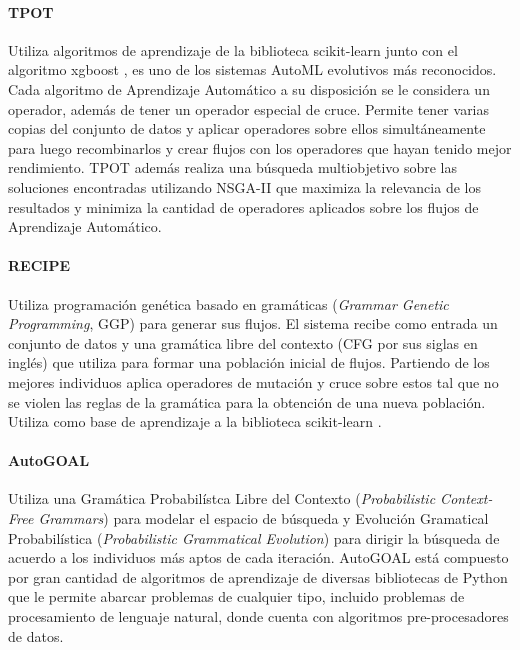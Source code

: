 \paragraph*{TPOT } Utiliza algoritmos de aprendizaje de la biblioteca scikit-learn  junto con el algoritmo xgboost , es uno de los sistemas AutoML evolutivos m\'as reconocidos. Cada algoritmo de Aprendizaje Autom\'atico a su disposici\'on se le considera un operador, adem\'as de tener un operador especial de cruce. Permite tener varias copias del conjunto de datos y aplicar operadores sobre ellos simult\'aneamente para luego recombinarlos y crear flujos con los operadores que hayan tenido mejor rendimiento. TPOT adem\'as realiza una b\'usqueda multiobjetivo sobre las soluciones encontradas utilizando NSGA-II  que maximiza la relevancia de los resultados y minimiza la cantidad de operadores aplicados sobre los flujos de Aprendizaje Autom\'atico. %

\paragraph*{RECIPE } Utiliza programaci\'on gen\'etica basado en gram\'aticas (\textit{Grammar Genetic Programming}, GGP) para generar sus flujos. El sistema recibe como entrada un conjunto de datos y una gram\'atica libre del contexto (CFG por sus siglas en ingl\'es) que utiliza para formar una poblaci\'on inicial de flujos. Partiendo de los mejores individuos aplica operadores de mutaci\'on y cruce sobre estos tal que no se violen las reglas de la gram\'atica para la obtenci\'on de una nueva poblaci\'on. Utiliza como base de aprendizaje a la biblioteca scikit-learn .
 

\paragraph{AutoGOAL } Utiliza una Gram\'atica Probabil\'istca Libre del Contexto (\textit{Probabilistic Context-Free Grammars}) para modelar el espacio de b\'usqueda y Evoluci\'on Gramatical  Probabil\'istica (\textit{Probabilistic Grammatical Evolution})  para dirigir la b\'usqueda de acuerdo a los individuos m\'as aptos de cada iteraci\'on. AutoGOAL est\'a compuesto por gran cantidad de algoritmos de aprendizaje de diversas bibliotecas de Python que le  permite abarcar problemas de cualquier tipo, incluido problemas de procesamiento de lenguaje natural, donde cuenta con algoritmos pre-procesadores de datos.

